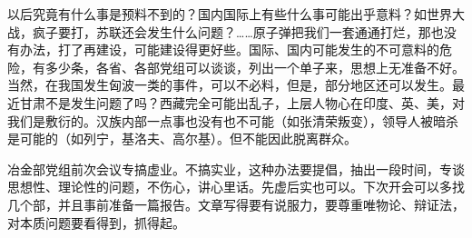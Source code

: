 以后究竟有什么事是预料不到的？国内国际上有些什么事可能出乎意料？如世界大战，疯子要打，苏联还会发生什么问题？……原子弹把我们一套通通打烂，那也没有办法，打了再建设，可能建设得更好些。国际、国内可能发生的不可意料的危险，有多少条，各省、各部党组可以谈谈，列出一个单子来，思想上无准备不好。当然，在我国发生匈波一类的事件，可以不必料，但是，部分地区还可以发生。最近甘肃不是发生问题了吗？西藏完全可能出乱子，上层人物心在印度、英、美，对我们是敷衍的。汉族内部一点事也没有也不可能（如张清荣叛变），领导人被暗杀是可能的（如列宁，基洛夫、高尔基）。但不能因此脱离群众。

冶金部党组前次会议专搞虚业。不搞实业，这种办法要提倡，抽出一段时间，专谈思想性、理论性的问题，不伤心，讲心里话。先虚后实也可以。下次开会可以多找几个部，并且事前准备一篇报告。文章写得要有说服力，要尊重唯物论、辩证法，对本质问题要看得到，抓得起。


